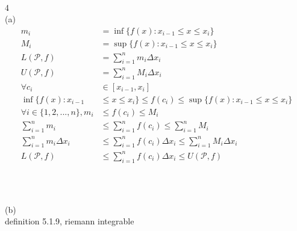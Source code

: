 \documentclass[12pt, border = 4pt, multi]{article} %
\begin{document}
\\
\\
\\
4\\
(a)\\
\begin{align*}
m_i &= \inf\{f(x): x_{i - 1} \leq x \leq x_i\}\\
M_i &= \sup\{f(x): x_{i - 1} \leq x \leq x_i\}\\
L(\mathcal{P}, f) &= \sum_{i = 1} ^ n m_i \Delta x_i\\
U(\mathcal{P}, f) &= \sum_{i = 1} ^ n M_i \Delta x_i\\
\forall c_i &\in [x_{i - 1}, x_i]\\
\inf\{f(x): x_{i - 1} &\leq x \leq x_i\} \leq f(c_i) \leq \sup\{f(x): x_{i - 1} \leq x \leq x_i\}\\
\forall i \in \{1, 2, ..., n\}, m_i &\leq f(c_i) \leq M_i\\
\sum_{i = 1} ^ n m_i &\leq \sum_{i = 1} ^ n f(c_i) \leq \sum_{i = 1} ^ n M_i\\ 
\sum_{i = 1} ^ n m_i \Delta x_i &\leq \sum_{i = 1} ^ n f(c_i)\Delta x_i \leq \sum_{i = 1} ^ n M_i \Delta x_i\\
L(\mathcal{P}, f) &\leq \sum_{i = 1} ^ n f(c_i)\Delta x_i \leq U(\mathcal{P}, f)\\
\end{align*}
\\
\\
\\
(b)\\
definition 5.1.9, riemann integrable
\end{document}
